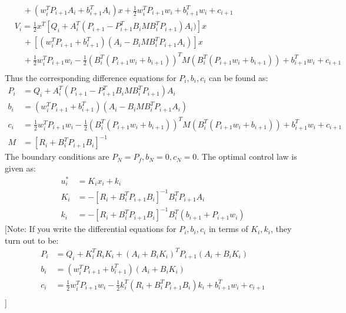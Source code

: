 \begin{enumerate}
\begin{enumerate}
\begin{align*}
   &\quad  + (w_i^T P_{i+1}A_i + b_{i+1}^T A_i) x + \frac{1}{2}w_i^T P_{i+1} w_i + b_{i+1}^T w_i + c_{i+1}\\
   &V_i = \frac{1}{2}x^T\left[Q_i + A_i^T (P_{i+1} - P_{i+1}^TB_i M B_i^T P_{i+1})A_i)\right]x \\
   &\quad  + \left[ (w_i^T P_{i+1} + b_{i+1}^T ) (A_i - B_i M B_i^T P_{i+1} A_i) \right]x\\
   &\quad + \frac{1}{2}w_i^T P_{i+1} w_i - \frac{1}{2} \left( B_i^T (P_{i+1} w_i + b_{i+1})\right)^T M \left( B_i^T(P_{i+1} w_i + b_{i+1})\right)+ b_{i+1}^T w_i + c_{i+1}\\
  \end{align*}
   Thus the corresponding difference equations for $P_i, b_i, c_i $ can be found as:
   \begin{align*}
    P_i &= Q_i + A_i^T (P_{i+1} - P_{i+1}^TB_i M B_i^T P_{i+1})A_i\\
    b_i &=  (w_i^T P_{i+1} + b_{i+1}^T ) (A_i - B_i M B_i^T P_{i+1} A_i)\\
    c_i &= \frac{1}{2}w_i^T P_{i+1} w_i - \frac{1}{2} \left( B_i^T (P_{i+1} w_i + b_{i+1})\right)^T M \left( B_i^T(P_{i+1} w_i + b_{i+1})\right)+ b_{i+1}^T w_i + c_{i+1}\\
    M &= \left[R_i + B_i^TP_{i+1}B_i\right]^{-1}
   \end{align*}
   The boundary conditions are $P_N = P_f, b_N = 0, c_N = 0$. The optimal control law is given as:
   \begin{align*}
   u^*_i &= K_i x_i + k_i\\
   K_i &= -\left[R_i + B_i^TP_{i+1}B_i\right]^{-1} B_i^T P_{i+1}A_i \\
   k_i &= -\left[R_i + B_i^TP_{i+1}B_i\right]^{-1} B_i^T (b_{i+1} + P_{i+1}w_i)
   \end{align*}
   [Note: If you write the differential equations for $P_i, b_i, c_i$ in terms of $K_i, k_i$, they turn out to be:
   \begin{align*}
    P_i &= Q_i + K_i^T R_i K_i + (A_i + B_i K_i)^T P_{i+1} (A_i + B_i K_i)\\
    b_i &= (w_i^T P_{i+1} + b_{i+1}^T)(A_i + B_i K_i)\\
    c_i &= \frac{1}{2}w_i^T P_{i+1} w_i - \frac{1}{2} k_i^T (R_i + B_i^T P_{i+1} B_i) k_i+ b_{i+1}^T w_i + c_{i+1}\\
   \end{align*}]






  \end{enumerate}


   
\end{enumerate} 
